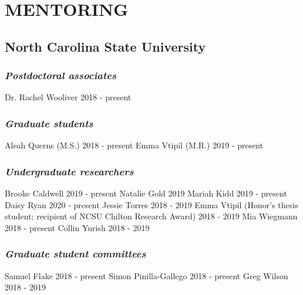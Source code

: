 \documentclass[11pt,english]{article}\usepackage[]{graphicx}\usepackage[]{color}
\begin{document}
\section*{MENTORING}


\subsection*{North Carolina State University}
\subsubsection*{\emph{Postdoctoral associates}}
Dr. Rachel Wooliver \hfill {2018 - present}
\subsubsection*{\emph{Graduate students}}
Aleah Querns (M.S.) \hfill {2018 - present} \newline
Emma Vtipil (M.R.) \hfill {2019 - present}

\subsubsection*{\emph{Undergraduate researchers}}
Brooke Caldwell \hfill {2019 - present} \newline
Natalie Gold \hfill {2019} \newline
Mariah Kidd \hfill {2019 - present} \newline
Daisy Ryan \hfill {2020 - present} \newline 
Jessie Torres \hfill {2018 - 2019} \newline
Emma Vtipil (Honor's thesis student; recipient of NCSU Chilton Research Award) \hfill {2018 - 2019} \newline
Mia Wiegmann \hfill {2018 - present} \newline 
Collin Yurish \hfill {2018 - 2019} 

\subsubsection*{\emph{Graduate student committees}}
Samuel Flake \hfill {2018 - present} \newline
Simon Pinilla-Gallego \hfill {2018 - present} \newline
Greg Wilson \hfill {2018 - 2019} 
\end{document}
